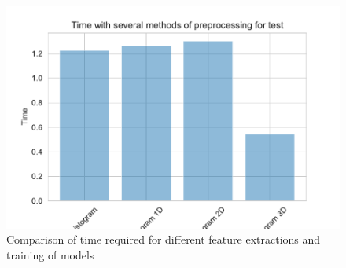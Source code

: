 \documentclass[11pt]{article}
\begin{document}
\begin{figure}[H]
\begin{minipage}[c]{0.3\textwidth}
\end{minipage}
\begin{minipage}[c]{0.3\textwidth}
\includegraphics[width=1\linewidth]{figures/Cifar/time_training_test.pdf}
\end{minipage}
\caption{Comparison of time required for different feature extractions and training of models}
\label{Cifar_time_comparison}
\end{figure}
\end{document}

